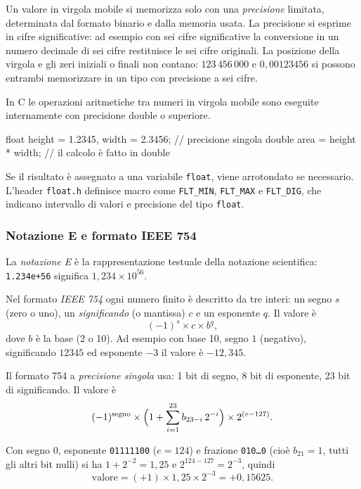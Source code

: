 \documentclass[11pt,a4paper]{article}
\begin{document}
Un valore in virgola mobile si memorizza solo con una \emph{precisione} limitata,
determinata dal formato binario e dalla memoria usata. La precisione si esprime in
cifre significative: ad esempio con sei cifre significative la conversione in un
numero decimale di sei cifre restituisce le sei cifre originali. La posizione della
virgola e gli zeri iniziali o finali non contano: $123\,456\,000$ e
$0{,}00123456$ si possono entrambi memorizzare in un tipo con precisione a sei
cifre.

In C le operazioni aritmetiche tra numeri in virgola mobile sono eseguite
internamente con precisione double o superiore.

\begin{codice}
float height = 1.2345, width = 2.3456;   // precisione singola
double area = height * width;            // il calcolo è fatto in double
\end{codice}

Se il risultato è assegnato a una variabile \lstinline|float|, viene arrotondato
se necessario. L'header \lstinline|float.h| definisce macro come
\lstinline|FLT_MIN|, \lstinline|FLT_MAX| e \lstinline|FLT_DIG|, che indicano
intervallo di valori e precisione del tipo \lstinline|float|.

\subsubsection{Notazione E e formato IEEE 754}

La \emph{notazione E} è la rappresentazione testuale della notazione scientifica:
\texttt{1.234e+56} significa $1{,}234 \times 10^{56}$.

Nel formato \emph{IEEE 754} ogni numero finito è descritto da tre interi: un segno
$s$ (zero o uno), un \emph{significando} (o mantissa) $c$ e un esponente $q$. Il
valore è
\[
  (-1)^s \times c \times b^q ,
\]
dove $b$ è la base (2 o 10). Ad esempio con base 10, segno $1$ (negativo),
significando $12345$ ed esponente $-3$ il valore è $-12{,}345$.

Il formato 754 a \emph{precisione singola} usa: 1 bit di segno, 8 bit di esponente,
23 bit di significando. Il valore è
\[
  (-1)^{\text{segno}} \times \Bigl( 1 + \sum_{i=1}^{23} b_{23-i}\, 2^{-i} \Bigr)
  \times 2^{(e - 127)} .
\]

\begin{esempio}
Con segno $0$, esponente \texttt{01111100} ($e = 124$) e frazione
\texttt{010\dots0} (cioè $b_{21} = 1$, tutti gli altri bit nulli) si ha
$1 + 2^{-2} = 1{,}25$ e $2^{124 - 127} = 2^{-3}$, quindi
\[
  \text{valore} = (+1) \times 1{,}25 \times 2^{-3} = +0{,}15625 .
\]
\end{esempio}
\end{document}
